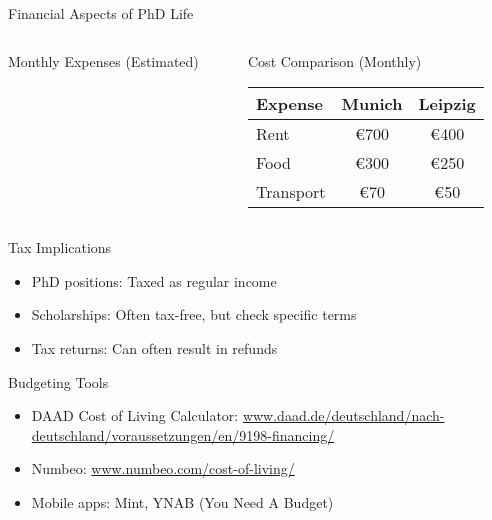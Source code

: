 \documentclass[aspectratio=169,10pt]{beamer}
\begin{document}
\begin{frame}{Financial Aspects of PhD Life}
\begin{columns}[T]
    \begin{column}{0.5\textwidth}
        \alert{Monthly Expenses (Estimated)}
    \end{column}
    \begin{column}{0.5\textwidth}
        \alert{Cost Comparison (Monthly)}
        \begin{tabular}{|l|c|c|}
        \hline
        Expense & Munich & Leipzig \\
        \hline
        Rent & €700 & €400 \\
        Food & €300 & €250 \\
        Transport & €70 & €50 \\
        \hline
        \end{tabular}
    \end{column}
\end{columns}

\vspace{0.3cm}
\alert{Tax Implications}
\begin{itemize}
    \item PhD positions: Taxed as regular income
    \item Scholarships: Often tax-free, but check specific terms
    \item Tax returns: Can often result in refunds
\end{itemize}

\alert{Budgeting Tools}
\begin{itemize}
    \item DAAD Cost of Living Calculator: \url{www.daad.de/deutschland/nach-deutschland/voraussetzungen/en/9198-financing/}
    \item Numbeo: \url{www.numbeo.com/cost-of-living/}
    \item Mobile apps: Mint, YNAB (You Need A Budget)
\end{itemize}
\end{frame}
\end{document}
